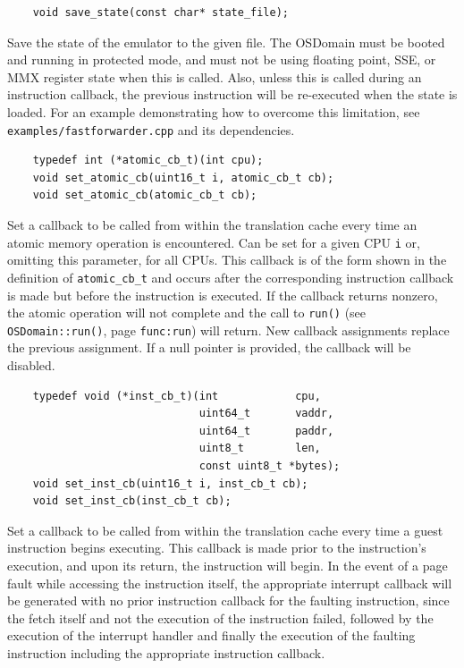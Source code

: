 \documentclass[letterpaper, 10pt]{book}
\begin{document}
\label{func:save_state} \begin{verbatim}
    void save_state(const char* state_file);
\end{verbatim}
Save the state of the emulator to the given file. The OSDomain must be booted
and running in protected mode, and must not be using floating point, SSE, or MMX
register state when this is called. Also, unless this is called during an
instruction callback, the previous instruction will be re-executed when the state
is loaded. For an example demonstrating how to overcome this limitation, see
\texttt{examples/fastforwarder.cpp} and its dependencies.

\label{func:set_atomic_cb} \begin{verbatim}
    typedef int (*atomic_cb_t)(int cpu);
    void set_atomic_cb(uint16_t i, atomic_cb_t cb);
    void set_atomic_cb(atomic_cb_t cb);
\end{verbatim}
Set a callback to be called from within the translation cache every time an
atomic memory operation is encountered. Can be set for a given CPU \texttt{i}
or, omitting this parameter, for all CPUs. This callback is of the form shown
in the definition of \texttt{atomic\_cb\_t} and occurs after the corresponding
instruction callback is made but before the instruction is executed. If the
callback returns nonzero, the atomic operation will not complete and the
call to \texttt{run()} (see \texttt{OSDomain::run()}, page \texttt{func:run})
will return. New callback assignments replace the previous assignment. If a
null pointer is provided, the callback will be disabled.

\label{func:set_inst_cb} \begin{verbatim}
    typedef void (*inst_cb_t)(int            cpu, 
                              uint64_t       vaddr, 
                              uint64_t       paddr, 
                              uint8_t        len, 
                              const uint8_t *bytes);
    void set_inst_cb(uint16_t i, inst_cb_t cb);
    void set_inst_cb(inst_cb_t cb);
\end{verbatim}
Set a callback to be called from within the translation cache every time a 
guest instruction begins executing. This callback is made prior to the
instruction's execution, and upon its return, the instruction will begin. In
the event of a page fault while accessing the instruction itself, the
appropriate interrupt callback will be generated with no prior instruction
callback for the faulting instruction, since the fetch itself and not the
execution of the instruction failed, followed by the execution of the interrupt
handler and finally the execution of the faulting instruction including the 
appropriate instruction callback.
\end{document}
